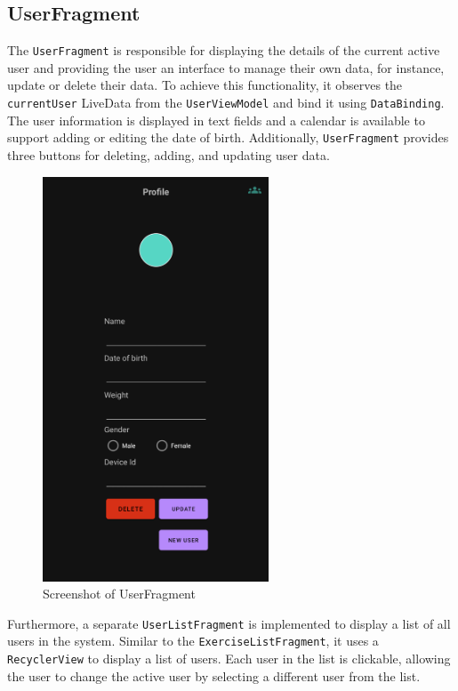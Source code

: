 \subsection{UserFragment}
The \texttt{UserFragment} is responsible for displaying the details of the current active user and providing the user an interface to manage their own data, for instance, update or delete their data. 
To achieve this functionality, it observes the \texttt{currentUser} LiveData from the \texttt{UserViewModel} and bind it using \texttt{DataBinding}. 
The user information is displayed in text fields and a calendar is available to support adding or editing the date of birth. 
Additionally, \texttt{UserFragment} provides three buttons for deleting, adding, and updating user data.
\begin{figure}[H]
    \centering
    \includegraphics[width=0.6\textwidth]{images/userfragment-screenshot.png}
    \caption{Screenshot of UserFragment}
    \label{fig:userfragment_screenshot}
\end{figure}

Furthermore, a separate \texttt{UserListFragment} is implemented to display a list of all users in the system. 
Similar to the \texttt{ExerciseListFragment}, it uses a \texttt{RecyclerView} to display a list of users. 
Each user in the list is clickable, allowing the user to change the active user by selecting a different user from the list.


